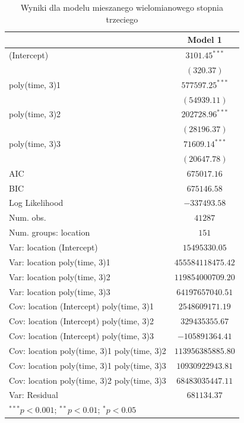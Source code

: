\documentclass[12pt]{mwbk}
\theoremstyle{plain}
\theoremstyle{definition}
\theoremstyle{remark}
\begin{document}
\begin{table}[htbp]
	\begin{center}
		\begin{tabular}{l c}
			\hline
			& Model 1 \\
			\hline
			(Intercept)                                 & $3101.45^{***}$   \\
			& $(320.37)$        \\
			poly(time, 3)1                              & $577597.25^{***}$ \\
			& $(54939.11)$      \\
			poly(time, 3)2                              & $202728.96^{***}$ \\
			& $(28196.37)$      \\
			poly(time, 3)3                              & $71609.14^{***}$  \\
			& $(20647.78)$      \\
			\hline
			AIC                                         & $675017.16$       \\
			BIC                                         & $675146.58$       \\
			Log Likelihood                              & $-337493.58$      \\
			Num. obs.                                   & $41287$           \\
			Num. groups: location                       & $151$             \\
			Var: location (Intercept)                   & $15495330.05$     \\
			Var: location poly(time, 3)1                & $455584118475.42$ \\
			Var: location poly(time, 3)2                & $119854000709.20$ \\
			Var: location poly(time, 3)3                & $64197657040.51$  \\
			Cov: location (Intercept) poly(time, 3)1    & $2548609171.19$   \\
			Cov: location (Intercept) poly(time, 3)2    & $329435355.67$    \\
			Cov: location (Intercept) poly(time, 3)3    & $-105891364.41$   \\
			Cov: location poly(time, 3)1 poly(time, 3)2 & $113956385885.80$ \\
			Cov: location poly(time, 3)1 poly(time, 3)3 & $10930922943.81$  \\
			Cov: location poly(time, 3)2 poly(time, 3)3 & $68483035447.11$  \\
			Var: Residual                               & $681134.37$       \\
			\hline
			\multicolumn{2}{l}{\scriptsize{$^{***}p<0.001$; $^{**}p<0.01$; $^{*}p<0.05$}}
		\end{tabular}
		\caption{Wyniki dla modelu mieszanego wielomianowego stopnia trzeciego}
		\label{table:mod1-poly}
	\end{center}
\end{table}
\end{document}
